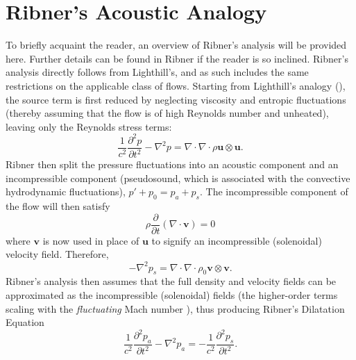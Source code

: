 \section{Ribner's Acoustic Analogy}
To briefly acquaint the reader, an overview of Ribner's analysis will be provided here.
Further details can be found in Ribner \citep{Ribner1962} if the reader is so inclined. 
Ribner's analysis directly follows from Lighthill's, and as such includes the same restrictions on the applicable class of flows.
Starting from Lighthill's analogy (), the source term is first reduced by neglecting viscosity and entropic fluctuations (thereby assuming that the flow is of high Reynolds number and unheated), leaving only the Reynolds stress terms:
\begin{equation}
	\frac{1}{c^2}\frac{\partial^2 p}{\partial t^2} - \nabla^2 p = \nabla \cdot \nabla \cdot \rho \mathbf{u} \otimes \mathbf{u}.
\end{equation}
Ribner then split the pressure fluctuations into an acoustic component and an incompressible component (pseudosound, which is associated with the convective hydrodynamic fluctuations), $p' + p_0 = p_a + p_s$. 
The incompressible component of the flow will then satisfy
\begin{equation}
	 \rho \frac{\partial}{\partial t} (\nabla \cdot \mathbf{v} )  = 0
\end{equation}
where $\mathbf{v}$ is now used in place of $\mathbf{u}$ to signify an incompressible (solenoidal) velocity field. 
Therefore, 
\begin{equation}
	- \nabla^2 p_s = \nabla \cdot \nabla \cdot \rho_0 \mathbf{v} \otimes \mathbf{v}.
	\label{eq:solenoidal_pressure}
\end{equation}
Ribner's analysis then assumes that the full density and velocity fields can be approximated as the incompressible (solenoidal) fields (the higher-order terms scaling with the \textit{fluctuating} Mach number \citep{Ristorcelli1997}), thus producing Ribner's Dilatation Equation
\begin{equation}
	\frac{1}{c^2}\frac{\partial^2 p_a}{\partial t^2} - \nabla^2 p_a = -\frac{1}{c^2}\frac{\partial^2 p_s}{\partial t^2}.
	\label{eq:ribner_source}
\end{equation} 


